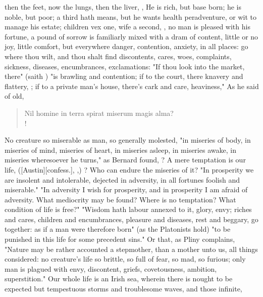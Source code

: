then the feet, now the lungs, then the liver, \etc{} , \etc{} He is rich, but base born; he is noble,
but poor; a third hath means, but he wants health peradventure, or wit to
manage his estate; children vex one, wife a second, \etc{} , no man is pleased with his fortune, a pound of
sorrow is familiarly mixed with a dram of content, little or no joy, little
comfort, but everywhere danger, contention, anxiety, in
all places: go where thou wilt, and thou shalt find discontents, cares, woes,
complaints, sickness, diseases, encumbrances, exclamations: "If thou look into
the market, there" (saith \Chrysostom{}) "is brawling and
contention; if to the court, there knavery and flattery, \etc{}; if to a
private man's house, there's cark and care, heaviness," \etc{} As he said of
old,

\begin{latin}
\begin{verse}%
Nil homine in terra spirat miserum magis alma?\\!
\end{verse}%
\end{latin}

No creature so miserable as man, so generally molested,
"in miseries of body, in miseries of mind, miseries of
heart, in miseries asleep, in miseries awake, in miseries wheresoever he
turns," as Bernard found, ? A
mere temptation is our life, ([Austin][\textlatin{confess.}], ,) ? Who can
endure the miseries of it? "In prosperity we are insolent
and intolerable, dejected in adversity, in all fortunes foolish and miserable."
"In adversity I wish for prosperity, and in prosperity I
am afraid of adversity. What mediocrity may be found? Where is no temptation?
What condition of life is free?" "Wisdom hath labour
annexed to it, glory, envy; riches and cares, children and encumbrances,
pleasure and diseases, rest and beggary, go together: as if a man were
therefore born" (as the Platonists hold) "to be punished in this life for some
precedent sins." Or that, as Pliny complains, "Nature may
be rather accounted a stepmother, than a mother unto us, all things considered:
no creature's life so brittle, so full of fear, so mad, so furious; only man is
plagued with envy, discontent, griefs, covetousness, ambition, superstition."
Our whole life is an Irish sea, wherein there is nought to be expected but
tempestuous storms and troublesome waves, and those infinite,

